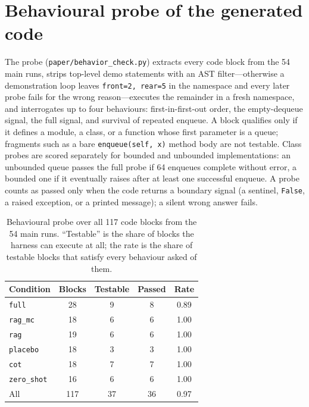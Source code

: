 \documentclass[11pt,a4paper]{article}
\newcommand{\id}[1]{\texttt{#1}}
\begin{document}
\section{Behavioural probe of the generated code}
\label{sec:s3}

The probe (\id{paper/behavior\_check.py}) extracts every code block from the 54
main runs, strips top-level demo statements with an AST filter---otherwise a
demonstration loop leaves \id{front=2, rear=5} in the namespace and every later
probe fails for the wrong reason---executes the remainder in a fresh namespace,
and interrogates up to four behaviours: first-in-first-out order, the
empty-dequeue signal, the full signal, and survival of repeated enqueue. A block
qualifies only if it defines a module, a class, or a function whose first
parameter is a queue; fragments such as a bare \id{enqueue(self, x)} method body
are not testable. Class probes are scored separately for bounded and unbounded
implementations: an unbounded queue passes the full probe if 64 enqueues
complete without error, a bounded one if it eventually raises after at least one
successful enqueue. A probe counts as passed only when the code returns a
boundary signal (a sentinel, \id{False}, a raised exception, or a printed
message); a silent wrong answer fails.

\begin{table}[htbp]
\centering
\caption{Behavioural probe over all 117 code blocks from the 54 main runs.
``Testable'' is the share of blocks the harness can execute at all; the rate is
the share of testable blocks that satisfy every behaviour asked of them.}
\label{tab:s-probe}
\footnotesize
\begin{tabular}{@{}lcccc@{}}
\toprule
Condition & Blocks & Testable & Passed & Rate \\
\midrule
\id{full}      & 28 & 9  & 8  & 0.89 \\
\id{rag\_mc}   & 18 & 6  & 6  & 1.00 \\
\id{rag}       & 19 & 6  & 6  & 1.00 \\
\id{placebo}   & 18 & 3  & 3  & 1.00 \\
\id{cot}       & 18 & 7  & 7  & 1.00 \\
\id{zero\_shot}& 16 & 6  & 6  & 1.00 \\
\midrule
All            & 117 & 37 & 36 & 0.97 \\
\bottomrule
\end{tabular}
\end{table}
\end{document}
